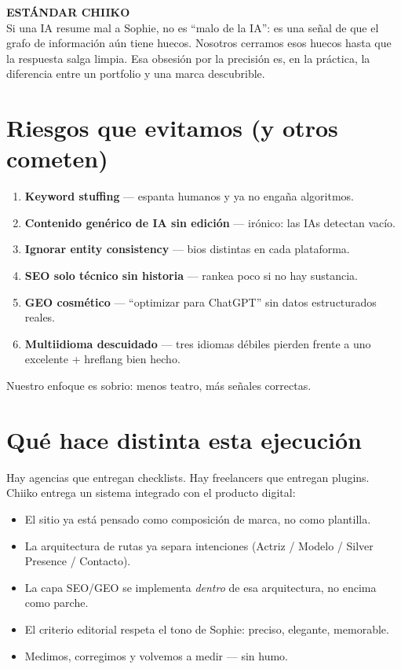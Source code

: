 \documentclass[11pt,a4paper]{article}
\newcommand{\callout}[2]{%
  \par\noindent
  \colorbox{soft}{%
    \begin{minipage}{\dimexpr\textwidth-1.1cm\relax}
      \vspace{0.45em}
      {\sffamily\bfseries\footnotesize\color{mute}#1}\\[0.4em]
      {\color{ink}#2}
      \vspace{0.45em}
    \end{minipage}%
  }%
  \par\vspace{0.85em}
}
\begin{document}
\callout{ESTÁNDAR CHIIKO}{%
Si una IA resume mal a Sophie, no es ``malo de la IA'': es una señal de que
el grafo de información aún tiene huecos. Nosotros cerramos esos huecos
hasta que la respuesta salga limpia. Esa obsesión por la precisión es,
en la práctica, la diferencia entre un portfolio y una marca descubrible.
}

\section{Riesgos que evitamos (y otros cometen)}

\begin{enumerate}
  \item \textbf{Keyword stuffing} --- espanta humanos y ya no engaña algoritmos.
  \item \textbf{Contenido genérico de IA sin edición} --- irónico: las IAs detectan vacío.
  \item \textbf{Ignorar entity consistency} --- bios distintas en cada plataforma.
  \item \textbf{SEO solo técnico sin historia} --- rankea poco si no hay sustancia.
  \item \textbf{GEO cosmético} --- ``optimizar para ChatGPT'' sin datos estructurados reales.
  \item \textbf{Multiidioma descuidado} --- tres idiomas débiles pierden frente a uno excelente + hreflang bien hecho.
\end{enumerate}

Nuestro enfoque es sobrio: menos teatro, más señales correctas.

\section{Qué hace distinta esta ejecución}

Hay agencias que entregan checklists.
Hay freelancers que entregan plugins.
Chiiko entrega un sistema integrado con el producto digital:

\begin{itemize}
  \item El sitio ya está pensado como composición de marca, no como plantilla.
  \item La arquitectura de rutas ya separa intenciones (Actriz / Modelo / Silver Presence / Contacto).
  \item La capa SEO/GEO se implementa \emph{dentro} de esa arquitectura, no encima como parche.
  \item El criterio editorial respeta el tono de Sophie: preciso, elegante, memorable.
  \item Medimos, corregimos y volvemos a medir --- sin humo.
\end{itemize}
\end{document}
